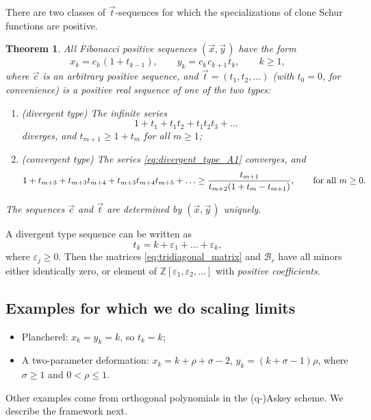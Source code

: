 \documentclass[letterpaper,11pt,oneside,reqno]{article}
\numberwithin{equation}{section}
\newcommand{\ssp}{\hspace{1pt}}
\newtheorem{theorem}[proposition]{Theorem}
\theoremstyle{definition}
\begin{document}
There are two classes of $\vec t$-sequences for which the
specializations of clone Schur functions are positive.
\begin{theorem}
	All Fibonacci positive sequences
	$(\vec x,\vec{y}\ssp)$
	have the form
	\begin{equation*}
		x_k=c_k\ssp (1+t_{k-1}),\qquad y_k=c_k\ssp c_{k+1}\ssp t_k, \qquad k\ge1,
	\end{equation*}
	where $\vec c$ is an
	arbitrary positive sequence,
	and $\vec t=(t_1,t_2,\ldots )$ (with $t_0=0$, for convenience) is
	a positive real sequence of one of the two types:
	\begin{enumerate}[$\bullet$]
		\item (divergent type)
			The infinite series
			\begin{equation}
				\label{eq:divergent_type_A1}
				1+t_1+t_1t_2+t_1t_2t_3+\ldots
			\end{equation}
			diverges, and
			$t_{m+1}\ge 1+t_m$ for all $m\ge 1$;
		\item (convergent type)
			The series \eqref{eq:divergent_type_A1} converges, and
			\begin{equation*}
				 1+t_{m+3}+t_{m+3}t_{m+4}+
				t_{m+3}t_{m+4}t_{m+5}+\ldots
				\ge
				\frac{t_{m+1}}{t_{m+2}(1+t_m-t_{m+1})}
				,
				\qquad
				\textnormal{for all }
				m\ge0.
			\end{equation*}
	\end{enumerate}
	The sequences $\vec c$ and $\vec t$ are determined by $(\vec x,\vec{y}\ssp)$ uniquely.
\end{theorem}

A divergent type sequence can be written
as
\begin{equation*}
	t_k=k+\varepsilon_1+\ldots+\varepsilon_k ,
\end{equation*}
where $\varepsilon_j\ge 0$. Then the matrices
\eqref{eq:tridiagonal_matrix} and $\mathcal{B}_r$
have all minors either identically zero,
or element of $\mathbb{Z}[\varepsilon_1,\varepsilon_2,\ldots ]$
with \emph{positive coefficients}.

\subsection{Examples for which we do scaling limits}

\begin{itemize}
	\item Plancherel: $x_k=y_k=k$, so $t_k=k$;
	\item A two-parameter deformation:
		$x_k=k+\rho+\sigma-2$, $y_k=(k+\sigma-1)\rho$,
		where $\sigma\ge 1$ and $0<\rho\le 1$.
\end{itemize}
Other examples come from orthogonal polynomials
in the (q-)Askey scheme. We describe the framework next.
\end{document}
